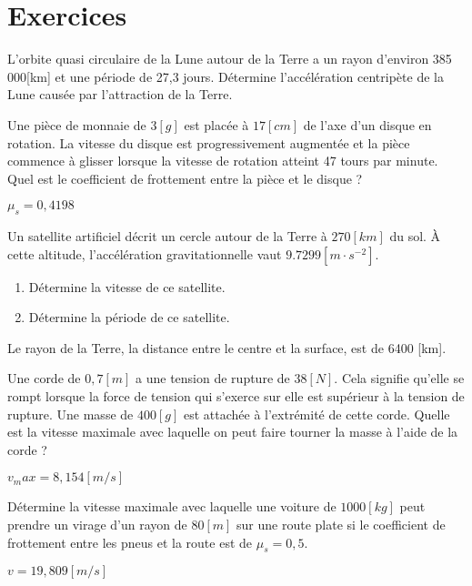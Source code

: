 \chapter{Exercices}
\begin{exercise}
    L'orbite quasi circulaire de la Lune autour de la Terre a un rayon d'environ 385 000[km] et une période de 27,3 jours.
    Détermine l'accélération centripète de la Lune causée par l'attraction de la Terre.
\end{exercise}

\begin{exercise}
    Une pièce de monnaie de \(3[g]\) est placée à \(17[cm]\) de l'axe d'un disque en rotation.
    La vitesse du disque est progressivement augmentée et la pièce commence à glisser lorsque la vitesse de rotation atteint 47 tours par minute.
    Quel est le coefficient de frottement entre la pièce et le disque ?
\end{exercise}
\begin{solution}
    \(\mu_s=0,4198\)
\end{solution}

\begin{exercise}
    Un satellite artificiel décrit un cercle autour de la Terre à \(270[km]\) du sol. À cette altitude, l'accélération gravitationnelle vaut \(9.7299[m \cdot s^{-2}]\).
    \begin{enumerate}[a]
        \item Détermine la vitesse de ce satellite.
        \item Détermine la période de ce satellite.
    \end{enumerate}
    Le rayon de la Terre, la distance entre le centre et la surface, est de 6400 [km].
\end{exercise}

\begin{exercise}
    Une corde de \(0,7[m]\) a une tension de rupture de \(38[N]\). Cela signifie qu'elle se rompt lorsque la force de tension qui s'exerce sur elle est supérieur à la tension de rupture. Une masse de \(400[g]\) est attachée à l'extrémité de cette corde. Quelle est la vitesse maximale avec laquelle on peut faire tourner la masse à l'aide de la corde ?
\end{exercise}
\begin{solution}
    \(v_max=8,154[m/s]\)
\end{solution}

\begin{exercise}
    Détermine la vitesse maximale avec laquelle une voiture de \(1000[kg]\) peut prendre un virage d'un rayon de \(80[m]\) sur une route plate si le coefficient de frottement entre les pneus et la route est de \(\mu _s=0,5\).
\end{exercise}
\begin{solution}
    \(v=19,809[m/s]\)
\end{solution}


